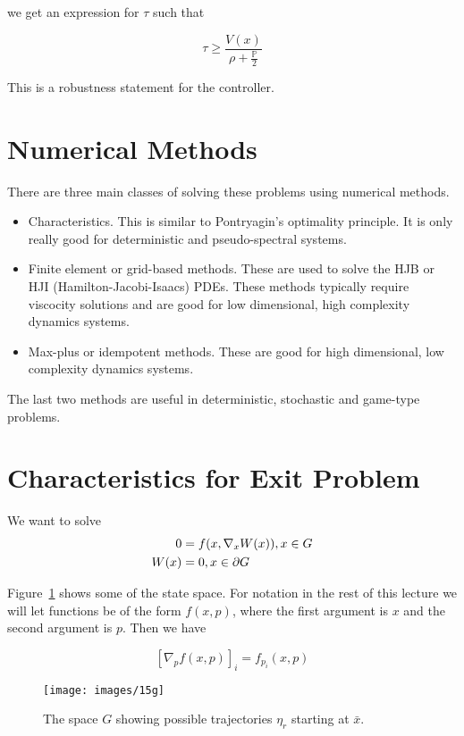 we get an expression for $\tau$ such that

\begin{equation*}
\tau\geq \frac{V(x)}{\rho+\frac{\mathbb{P}}{2}}
\end{equation*}

This is a robustness statement for the controller.

\section{Numerical Methods}
There are three main classes of solving these problems using numerical methods.
\begin{itemize}
\item Characteristics.
This is similar to Pontryagin's optimality principle.
It is only really good for deterministic and pseudo-spectral systems.
\item Finite element or grid-based methods.
These are used to solve the HJB or HJI (Hamilton-Jacobi-Isaacs) PDEs.
These methods typically require viscocity solutions and are good for low dimensional, high complexity dynamics systems.
\item Max-plus or idempotent methods.
These are good for high dimensional, low complexity dynamics systems.
\end{itemize}
The last two methods are useful in deterministic, stochastic and game-type problems.

\section{Characteristics for Exit Problem}
We want to solve
\begin{align*}
0 &= f(x,\nabla_xW(x)), x\in G \\
W(x) &= 0, x\in\partial G
\end{align*}

Figure~\ref{fig:15g} shows some of the state space.
For notation in the rest of this lecture we will let functions be of the form $f(x,p)$, where the first argument is $x$ and the second argument is $p$.
Then we have

\begin{equation*}
{[\nabla_p f(x,p)]}_i = f_{p_i}(x,p)
\end{equation*}

\begin{figure}[ht!]
\centering
\texttt{[image: images/15g]}
\caption{The space $G$ showing possible trajectories $\eta_r$ starting at $\bar{x}$.}%
\label{fig:15g}
\end{figure}

